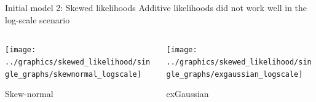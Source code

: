 \begin{frame}{Initial model 2: Skewed likelihoods}
    Additive likelihoods did not work well in the log-scale scenario

    \begin{columns}
        \begin{column}{0.49\textwidth}
            \centering
            \texttt{[image: ../graphics/skewed\_likelihood/single\_graphs/skewnormal\_logscale]}

            Skew-normal
        \end{column}

        \begin{column}{0.49\textwidth}
            \centering
            \texttt{[image: ../graphics/skewed\_likelihood/single\_graphs/exgaussian\_logscale]}

            exGaussian
        \end{column}
    \end{columns}

\end{frame}